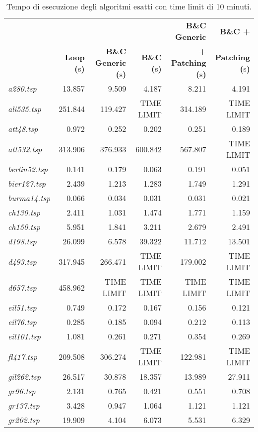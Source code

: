 {\footnotesize
\begin{longtable}[H]{lrrrrr}
\caption{Tempo di esecuzione degli algoritmi esatti con time limit di 10 minuti.}\\
\hline
{} & {} & {} & {} & \textbf{B\&C Generic} & \textbf{B\&C +}\\
{} & \textbf{Loop (}s\textbf{)} & \textbf{B\&C Generic (}s\textbf{)} & \textbf{B\&C (}s\textbf{)} & \textbf{+ Patching (}s\textbf{)} & \textbf{Patching (}s\textbf{)}\\
\hline
\textit{a280.tsp} & 13.857 & 9.509 & 4.187 & 8.211 & 4.191\\
\textit{ali535.tsp} & 251.844 & 119.427 & TIME LIMIT & 314.189 & TIME LIMIT\\
\textit{att48.tsp} & 0.972 & 0.252 & 0.202 & 0.251 & 0.189\\
\textit{att532.tsp} & 313.906 & 376.933 & 600.842 & 567.807 & TIME LIMIT\\
\textit{berlin52.tsp} & 0.141 & 0.179 & 0.063 & 0.191 & 0.051\\
\textit{bier127.tsp} & 2.439 & 1.213 & 1.283 & 1.749 & 1.291\\
\textit{burma14.tsp} & 0.066 & 0.034 & 0.031 & 0.031 & 0.021\\
\textit{ch130.tsp} & 2.411 & 1.031 & 1.474 & 1.771 & 1.159\\
\textit{ch150.tsp} & 5.951 & 1.841 & 3.211 & 2.679 & 2.491\\
\textit{d198.tsp} & 26.099 & 6.578 & 39.322 & 11.712 & 13.501\\
\textit{d493.tsp} & 317.945 & 266.471 & TIME LIMIT & 179.002 & TIME LIMIT\\
\textit{d657.tsp} & 458.962 & TIME LIMIT & TIME LIMIT & TIME LIMIT & TIME LIMIT\\
\textit{eil51.tsp} & 0.749 & 0.172 & 0.167 & 0.156 & 0.121\\
\textit{eil76.tsp} & 0.285 & 0.185 & 0.094 & 0.212 & 0.113\\
\textit{eil101.tsp} & 1.081 & 0.261 & 0.271 & 0.354 & 0.269\\
\textit{fl417.tsp} & 209.508 & 306.274 & TIME LIMIT & 122.981 & TIME LIMIT\\
\textit{gil262.tsp} & 26.517 & 30.878 & 18.357 & 13.989 & 27.911\\
\textit{gr96.tsp} & 2.131 & 0.765 & 0.421 & 0.551 & 0.708\\
\textit{gr137.tsp} & 3.428 & 0.947 & 1.064 & 1.121 & 1.121\\
\textit{gr202.tsp} & 19.909 & 4.104 & 6.073 & 5.531 & 6.329\\

\end{longtable}}
